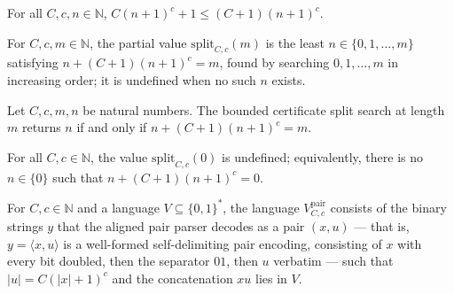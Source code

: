 \begin{lemma}
\label{Complexity.certificate_room}
\leanok
{}
For all $C,c,n\in\mathbb{N}$, $C(n+1)^c+1\le (C+1)(n+1)^c$.
\end{lemma}

\begin{definition}
\label{Complexity.certificateSplit}
\leanok
For $C, c, m \in \mathbb{N}$, the partial value $\mathrm{split}_{C,c}(m)$ is the
least $n \in \{0, 1, \dots, m\}$ satisfying $n + (C+1)(n+1)^c = m$, found by
searching $0, 1, \dots, m$ in increasing order; it is undefined when no such $n$
exists.
\end{definition}

\begin{lemma}
\label{Complexity.certificateSplit_spec}
\leanok
{}
Let $C,c,m,n$ be natural numbers. The bounded certificate split search at length $m$
returns $n$ if and only if $n+(C+1)(n+1)^c=m$.
\end{lemma}

\begin{lemma}
\label{Complexity.certificateSplit_zero}
\leanok
{}
For all $C,c\in\mathbb{N}$, the value $\mathrm{split}_{C,c}(0)$ is undefined;
equivalently, there is no $n\in\{0\}$ such that $n+(C+1)(n+1)^c=0$.
\end{lemma}

\begin{definition}
\label{Complexity.pairedVerifier}
\leanok
{}
For $C, c \in \mathbb{N}$ and a language $V \subseteq \{0,1\}^{*}$, the language
$V^{\mathrm{pair}}_{C,c}$ consists of the binary strings $y$ that the aligned
pair parser decodes as a pair $(x, u)$ --- that is, $y = \langle x, u\rangle$ is
a well-formed self-delimiting pair encoding, consisting of $x$ with every bit
doubled, then the separator $01$, then $u$ verbatim --- such that
$|u| = C(|x|+1)^c$ and the concatenation $xu$ lies in $V$.
\end{definition}

